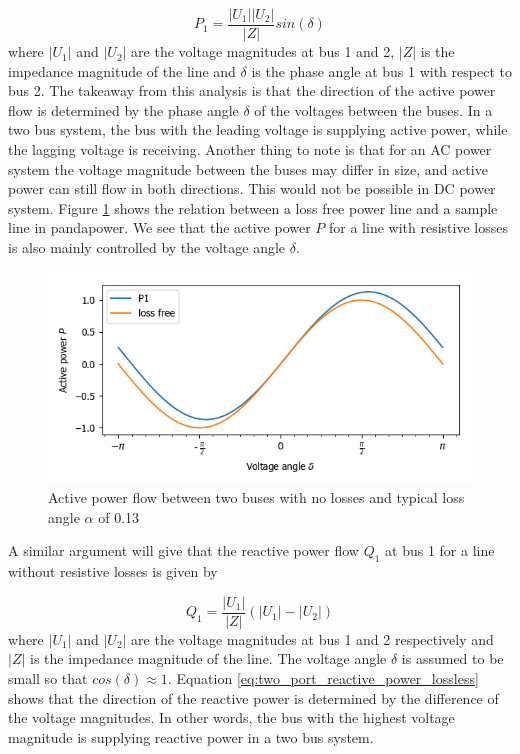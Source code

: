 \documentclass[class=book, crop=false]{standalone}
\begin{document}
\begin{equation}\label{eq:two_port_active_power_lossless}
P_{1} =  \frac{|U_{1}||U_{2}|}{|Z|}sin(\delta)
\end{equation}
where $|U_{1}|$ and $|U_{2}|$ are the voltage magnitudes at bus 1 and 2, $|Z|$ is the impedance magnitude of the line and $\delta$ is the phase angle at bus 1 with respect to bus 2. The takeaway from this analysis is that the direction of the active power flow is determined by the phase angle $\delta$ of the voltages between the buses. In a two bus system, the bus with the leading voltage is supplying active power, while the lagging voltage is receiving. Another thing to note is that for an AC power system the voltage magnitude between the buses may differ in size, and active power can still flow in both directions. This would not be possible in DC power system. Figure \ref{fig:theory:active_power_flow} shows the relation between a loss free power line and a sample line in pandapower. We see that the active power $P$ for a line with resistive losses is also mainly controlled by the voltage angle $\delta$.

\begin{figure}[ht!]
    \center
    \includegraphics[width=12cm]{figures/active_power_flow.png}
    \caption[size = 9]{Active power flow between two buses with no losses and typical loss angle $\alpha$ of 0.13}
	\label{fig:theory:active_power_flow}
\end{figure}

A similar argument will give that the reactive power flow $Q_{1}$ at bus 1 for a line without resistive losses is given by 

\begin{equation}\label{eq:two_port_reactive_power_lossless}
Q_{1} =  \frac{|U_{1}|}{|Z|}(|U_{1}| - |U_{2}|)
\end{equation}
where $|U_{1}|$ and $|U_{2}|$ are the voltage magnitudes at bus 1 and 2 respectively and $|Z|$ is the impedance magnitude of the line. The voltage angle $\delta$ is assumed to be small so that $cos(\delta) \approx 1$. Equation \eqref{eq:two_port_reactive_power_lossless} shows that the direction of the reactive power is determined by the difference of the voltage magnitudes. In other words, the bus with the highest voltage magnitude is supplying reactive power in a two bus system.
\end{document}
